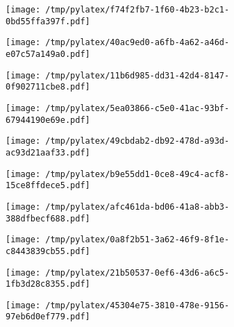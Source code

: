 \documentclass{article}
\begin{document}
\begin{figure}[htbp]
\begin{subfigure}[b]{.3\linewidth}
\texttt{[image: /tmp/pylatex/f74f2fb7-1f60-4b23-b2c1-0bd55ffa397f.pdf]}
\end{subfigure}
\begin{subfigure}[b]{.3\linewidth}
\texttt{[image: /tmp/pylatex/40ac9ed0-a6fb-4a62-a46d-e07c57a149a0.pdf]}
\end{subfigure}
\begin{subfigure}[b]{.3\linewidth}
\texttt{[image: /tmp/pylatex/11b6d985-dd31-42d4-8147-0f902711cbe8.pdf]}
\end{subfigure}
\begin{subfigure}[b]{.3\linewidth}
\texttt{[image: /tmp/pylatex/5ea03866-c5e0-41ac-93bf-67944190e69e.pdf]}
\end{subfigure}
\begin{subfigure}[b]{.3\linewidth}
\texttt{[image: /tmp/pylatex/49cbdab2-db92-478d-a93d-ac93d21aaf33.pdf]}
\end{subfigure}
\begin{subfigure}[b]{.3\linewidth}
\texttt{[image: /tmp/pylatex/b9e55dd1-0ce8-49c4-acf8-15ce8ffdece5.pdf]}
\end{subfigure}
\begin{subfigure}[b]{.3\linewidth}
\texttt{[image: /tmp/pylatex/afc461da-bd06-41a8-abb3-388dfbecf688.pdf]}
\end{subfigure}
\begin{subfigure}[b]{.3\linewidth}
\texttt{[image: /tmp/pylatex/0a8f2b51-3a62-46f9-8f1e-c8443839cb55.pdf]}
\end{subfigure}
\begin{subfigure}[b]{.3\linewidth}
\texttt{[image: /tmp/pylatex/21b50537-0ef6-43d6-a6c5-1fb3d28c8355.pdf]}
\end{subfigure}
\begin{subfigure}[b]{.3\linewidth}
\texttt{[image: /tmp/pylatex/45304e75-3810-478e-9156-97eb6d0ef779.pdf]}
\end{subfigure}
\end{figure}
\end{document}

